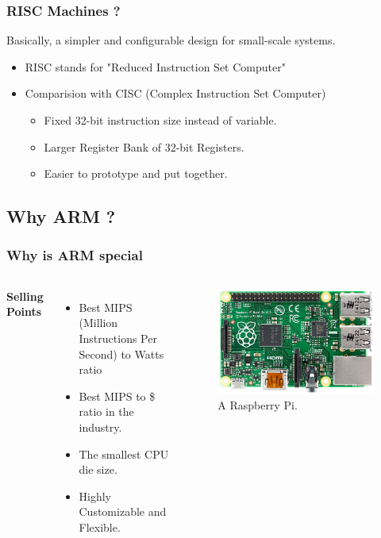 \documentclass{beamer}
\begin{document}

\begin{frame}
\frametitle{RISC Machines ?}
Basically, a simpler and configurable design for small-scale systems.
\begin{itemize}
\item RISC stands for "Reduced Instruction Set Computer"
\item Comparision with CISC (Complex Instruction Set Computer)
\begin{itemize}
\item  Fixed 32-bit instruction size instead of variable.
\item Larger Register Bank of 32-bit Registers.
\item Easier to prototype and put together.
\end{itemize}
\end{itemize}

\end{frame}

\subsection{Why ARM ?}
\begin{frame}
\frametitle{Why is ARM special}
\begin{columns}[c] %

\textbf{Selling Points}
\begin{itemize}
\item Best MIPS (Million Instructions Per Second) to Watts ratio
\item Best MIPS to \$ ratio in the industry.
\item The smallest CPU die size.
\item Highly Customizable and Flexible.
\end{itemize}

\begin{figure}
\includegraphics[width=0.8\linewidth]{Raspberry_Pi.jpg}
\caption{A Raspberry Pi.}
\end{figure}

\end{columns}
\end{frame}
\end{document}
